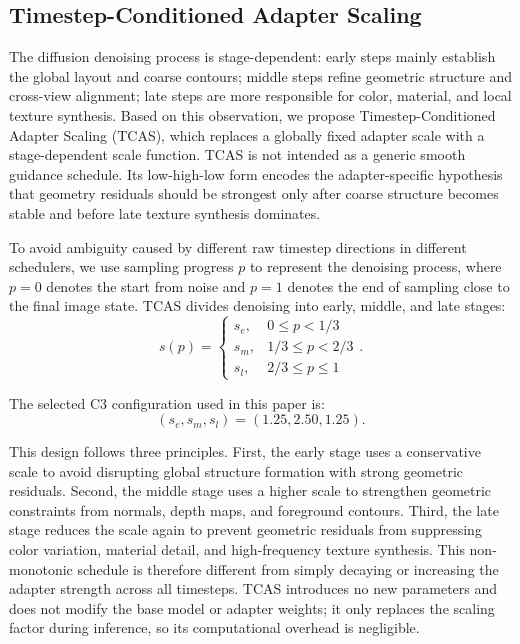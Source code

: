 \documentclass[times,twocolumn,final]{elsarticle}
\begin{document}
\subsection{Timestep-Conditioned Adapter Scaling}
\label{subsec:tcas}

The diffusion denoising process is stage-dependent: early steps mainly establish the global layout and coarse contours; middle steps refine geometric structure and cross-view alignment; late steps are more responsible for color, material, and local texture synthesis. Based on this observation, we propose Timestep-Conditioned Adapter Scaling (TCAS), which replaces a globally fixed adapter scale with a stage-dependent scale function. TCAS is not intended as a generic smooth guidance schedule. Its low-high-low form encodes the adapter-specific hypothesis that geometry residuals should be strongest only after coarse structure becomes stable and before late texture synthesis dominates.

To avoid ambiguity caused by different raw timestep directions in different schedulers, we use sampling progress $p$ to represent the denoising process, where $p = 0$ denotes the start from noise and $p = 1$ denotes the end of sampling close to the final image state. TCAS divides denoising into early, middle, and late stages:
\begin{equation}
s(p) = \begin{cases} s_e, & 0 \leq p < 1/3 \\ s_m, & 1/3 \leq p < 2/3 \\ s_l, & 2/3 \leq p \leq 1 \end{cases}.
\label{eq:tcas}
\end{equation}

The selected C3 configuration used in this paper is:
\begin{equation}
(s_e, s_m, s_l) = (1.25, 2.50, 1.25).
\end{equation}

This design follows three principles. First, the early stage uses a conservative scale to avoid disrupting global structure formation with strong geometric residuals. Second, the middle stage uses a higher scale to strengthen geometric constraints from normals, depth maps, and foreground contours. Third, the late stage reduces the scale again to prevent geometric residuals from suppressing color variation, material detail, and high-frequency texture synthesis. This non-monotonic schedule is therefore different from simply decaying or increasing the adapter strength across all timesteps. TCAS introduces no new parameters and does not modify the base model or adapter weights; it only replaces the scaling factor during inference, so its computational overhead is negligible.
\end{document}
